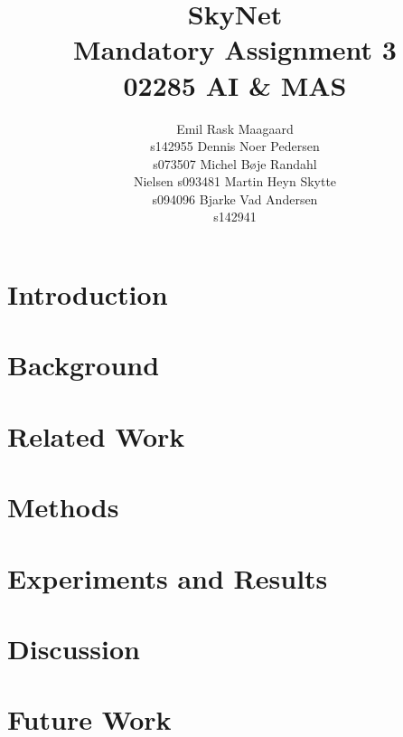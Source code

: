 \documentclass[letterpaper]{article}
\begin{document}
\title{SkyNet \\ Mandatory Assignment 3 \\ 02285 AI \& MAS}
\author{Emil Rask Maagaard \\ s142955 \And Dennis Noer Pedersen \\ s073507 \And
  Michel B\o je Randahl \\ Nielsen s093481 \AND Martin Heyn Skytte \\ s094096 \And
  Bjarke Vad Andersen \\ s142941}
\maketitle
\begin{abstract}

\end{abstract}

\section{Introduction}


\section{Background}


\section{Related Work}


\section{Methods}


\section{Experiments and Results}


\section{Discussion}


\section{Future Work}




\end{document}
